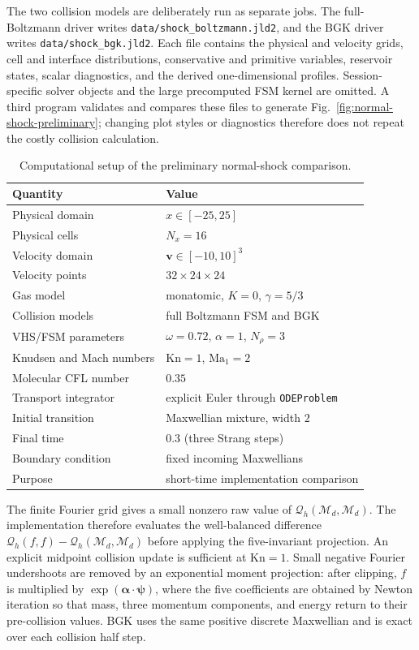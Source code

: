 \documentclass[preprint,3p,12pt]{elsarticle}
\newcommand{\vct}[1]{\boldsymbol{#1}}
\begin{document}
The two collision models are deliberately run as separate jobs. The full-Boltzmann driver writes \texttt{data/shock\_boltzmann.jld2}, and the BGK driver writes \texttt{data/shock\_bgk.jld2}. Each file contains the physical and velocity grids, cell and interface distributions, conservative and primitive variables, reservoir states, scalar diagnostics, and the derived one-dimensional profiles. Session-specific solver objects and the large precomputed FSM kernel are omitted. A third program validates and compares these files to generate Fig.~\ref{fig:normal-shock-preliminary}; changing plot styles or diagnostics therefore does not repeat the costly collision calculation.

\begin{table}[htbp]
  \centering
  \caption{Computational setup of the preliminary normal-shock comparison.}
  \label{tab:normal-shock-setup}
  \begin{tabular}{ll}
    \toprule
    Quantity & Value \\
    \midrule
    Physical domain & $x\in[-25,25]$ \\
    Physical cells & $N_x=16$ \\
    Velocity domain & $\vct{v}\in[-10,10]^3$ \\
    Velocity points & $32\times24\times24$ \\
    Gas model & monatomic, $K=0$, $\gamma=5/3$ \\
    Collision models & full Boltzmann FSM and BGK \\
    VHS/FSM parameters & $\omega=0.72$, $\alpha=1$, $N_{\rho}=3$ \\
    Knudsen and Mach numbers & $\mathrm{Kn}=1$, $\mathrm{Ma}_1=2$ \\
    Molecular CFL number & $0.35$ \\
    Transport integrator & explicit Euler through \texttt{ODEProblem} \\
    Initial transition & Maxwellian mixture, width $2$ \\
    Final time & $0.3$ (three Strang steps) \\
    Boundary condition & fixed incoming Maxwellians \\
    Purpose & short-time implementation comparison \\
    \bottomrule
  \end{tabular}
\end{table}

\FloatBarrier

The finite Fourier grid gives a small nonzero raw value of $\mathcal{Q}_h(\mathcal{M}_d,\mathcal{M}_d)$. The implementation therefore evaluates the well-balanced difference $\mathcal{Q}_h(f,f)-\mathcal{Q}_h(\mathcal{M}_d,\mathcal{M}_d)$ before applying the five-invariant projection. An explicit midpoint collision update is sufficient at $\mathrm{Kn}=1$. Small negative Fourier undershoots are removed by an exponential moment projection: after clipping, $f$ is multiplied by $\exp(\vct{\alpha}\cdot\vct{\psi})$, where the five coefficients are obtained by Newton iteration so that mass, three momentum components, and energy return to their pre-collision values. BGK uses the same positive discrete Maxwellian and is exact over each collision half step.
\end{document}
